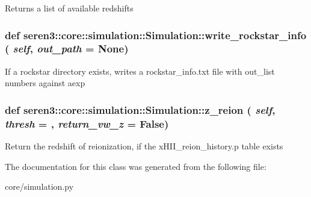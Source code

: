\label{classseren3_1_1core_1_1simulation_1_1Simulation_adb741a615add9f0ad27ae17f8056dbdb}
\begin{DoxyVerb}
Returns a list of available redshifts
\end{DoxyVerb}
 \hypertarget{classseren3_1_1core_1_1simulation_1_1Simulation_aa90efe09e29160d62dd8c58589256e79}{
\subsubsection[{write\_\-rockstar\_\-info}]{\setlength{\rightskip}{0pt plus 5cm}def seren3::core::simulation::Simulation::write\_\-rockstar\_\-info ( {\em self}, \/   {\em out\_\-path} = {\ttfamily None})}}
\label{classseren3_1_1core_1_1simulation_1_1Simulation_aa90efe09e29160d62dd8c58589256e79}
\begin{DoxyVerb}
If a rockstar directory exists, writes a rockstar_info.txt file
with out_list numbers against aexp
\end{DoxyVerb}
 \hypertarget{classseren3_1_1core_1_1simulation_1_1Simulation_a34c55c0ffe6c969c39ac032d6b0ad1c9}{
\subsubsection[{z\_\-reion}]{\setlength{\rightskip}{0pt plus 5cm}def seren3::core::simulation::Simulation::z\_\-reion ( {\em self}, \/   {\em thresh} = {}, \/   {\em return\_\-vw\_\-z} = {\ttfamily False})}}
\label{classseren3_1_1core_1_1simulation_1_1Simulation_a34c55c0ffe6c969c39ac032d6b0ad1c9}
\begin{DoxyVerb}
Return the redshift of reionization, if the xHII_reion_history.p
table exists
\end{DoxyVerb}
 

The documentation for this class was generated from the following file:\begin{DoxyCompactItemize}
\item 
core/simulation.py\end{DoxyCompactItemize}
